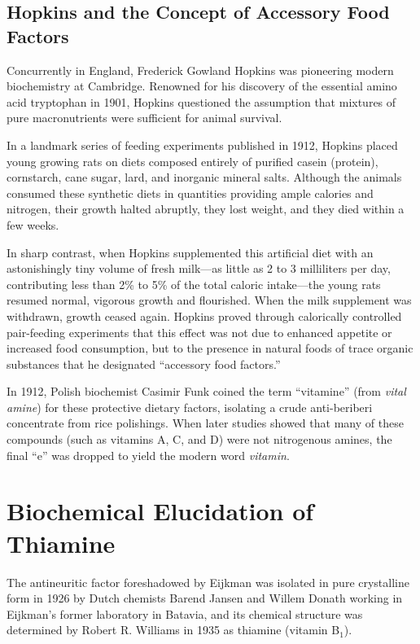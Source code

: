 \subsection{Hopkins and the Concept of Accessory Food Factors}

Concurrently in England, Frederick Gowland Hopkins was pioneering modern biochemistry at Cambridge. Renowned for his discovery of the essential amino acid tryptophan in 1901, Hopkins questioned the assumption that mixtures of pure macronutrients were sufficient for animal survival.

In a landmark series of feeding experiments published in 1912, Hopkins placed young growing rats on diets composed entirely of purified casein (protein), cornstarch, cane sugar, lard, and inorganic mineral salts. Although the animals consumed these synthetic diets in quantities providing ample calories and nitrogen, their growth halted abruptly, they lost weight, and they died within a few weeks. 

In sharp contrast, when Hopkins supplemented this artificial diet with an astonishingly tiny volume of fresh milk—as little as 2 to 3 milliliters per day, contributing less than 2\% to 5\% of the total caloric intake—the young rats resumed normal, vigorous growth and flourished. When the milk supplement was withdrawn, growth ceased again. Hopkins proved through calorically controlled pair-feeding experiments that this effect was not due to enhanced appetite or increased food consumption, but to the presence in natural foods of trace organic substances that he designated ``accessory food factors.''

In 1912, Polish biochemist Casimir Funk coined the term ``vitamine'' (from \emph{vital amine}) for these protective dietary factors, isolating a crude anti-beriberi concentrate from rice polishings. When later studies showed that many of these compounds (such as vitamins A, C, and D) were not nitrogenous amines, the final ``e'' was dropped to yield the modern word \emph{vitamin}.

\section{Biochemical Elucidation of Thiamine}

The antineuritic factor foreshadowed by Eijkman was isolated in pure crystalline form in 1926 by Dutch chemists Barend Jansen and Willem Donath working in Eijkman's former laboratory in Batavia, and its chemical structure was determined by Robert R. Williams in 1935 as thiamine (vitamin B$_1$). 

